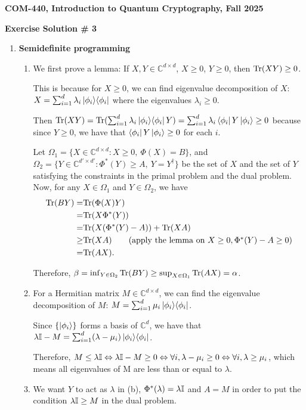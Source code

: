 \documentclass[12pt]{article}
\newcommand{\header}[1]{\begin{center} {\large\bf #1} \end{center}}
\begin{document}
\header{COM-440, Introduction to Quantum Cryptography, Fall 2025}
\header{\bf Exercise Solution \# 3}


\begin{enumerate}

\item {\bf Semidefinite programming}
\begin{enumerate}
\item We first prove a lemma: If $X,Y\in \mathbb{C}^{d \times d}$, $X\ge 0$, $Y\ge 0$, then $\mathrm{Tr}(XY)\ge 0$.

This is because for $X \ge 0$, we can find eigenvalue decomposition of $X$: $X = \sum_{i = 1}^d \lambda_i \ket{\phi_i}\!\bra{\phi_i}$ where the eigenvalues $\lambda_i \ge 0$. 

Then $\mathrm{Tr}(XY) = \mathrm{Tr}(\sum_{i = 1}^d \lambda_i \ket{\phi_i}\!\bra{\phi_i}Y) = \sum_{i = 1}^d\lambda_i \bra{\phi_i} Y \ket{\phi_i} \ge 0$ because since $Y \ge 0$, we have that $\bra{\phi_i} Y \ket{\phi_i} \ge 0$ for each $i$.

Let $\Omega_1=\{X\in \mathbb{C}^{d \times d} : X\ge 0,\ \Phi(X)=B \}$, and $\Omega_2=\{Y\in \mathbb{C}^{d' \times d'} : \Phi^{*}(Y)\ge A,\ Y=Y^\dagger \}$ be the set of $X$ and the set of $Y$ satisfying the constraints in the primal problem and the dual problem.
Now, for any $X\in\Omega_1$ and $Y\in\Omega_2$, we have
\begin{align*}
  \Tr(BY)
  =& \Tr(\Phi(X)Y)\\
  =& \Tr(X \Phi^{*}(Y))\\
  =& \Tr(X (\Phi^{*}(Y) - A)) + \Tr(XA)\\
  \ge& \Tr(X A) \tag{apply the lemma on $X \ge 0, \Phi^{*}(Y) - A \ge 0$}\\
  =& \Tr(AX).
\end{align*}

Therefore, $\beta = \inf_{Y \in \Omega_2}\mathrm{Tr}(BY) \ge \sup_{X \in \Omega_1}\mathrm{Tr}(AX) = \alpha$.

\item For a Hermitian matrix $M \in \mathbb{C}^{d \times d}$, we can find the eigenvalue decomposition of $M$: $M = \sum_{i = 1}^d \mu_i \ket{\phi_i}\!\bra{\phi_i}$.

Since $\{\ket{\phi_i}\}$ forms a basis of $\mathbb{C}^{d}$, we have that $\lambda\mathbb{I} - M = \sum_{i = 1}^d (\lambda - \mu_i) \ket{\phi_i}\!\bra{\phi_i} $.

Therefore, $M \leq \lambda \mathbb{I} \Leftrightarrow \lambda\mathbb{I} - M \ge 0 \Leftrightarrow \forall i, \lambda - \mu_i \ge 0 \Leftrightarrow \forall i, \lambda \ge \mu_i$, which means all eigenvalues of M are less than or equal to $\lambda$.
\item We want $Y$ to act as $\lambda$ in (b), $\Phi^*(\lambda) = \lambda \mathbb{I}$ and $A = M$ in order to put the condition $\lambda \mathbb{I} \ge M$ in the dual problem. 


\end{enumerate}
\end{enumerate}
\end{document}
